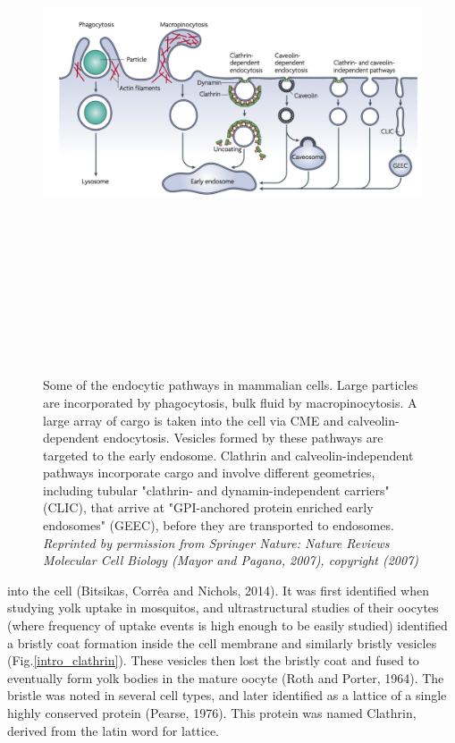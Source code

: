 \begin{figure}[H]
	\hspace*{-1cm}
	\includegraphics[width=14cm, height=16cm, keepaspectratio]{figures/intro/Fig1_mayor}
	\caption[Endocytic pathways in cells]
	{Some of the endocytic pathways in mammalian cells. Large particles are incorporated by phagocytosis, bulk fluid by macropinocytosis. A large array of cargo is taken into the cell via CME and calveolin-dependent endocytosis. Vesicles formed by these pathways are targeted to the early endosome. Clathrin and calveolin-independent pathways incorporate cargo and involve different geometries, including tubular "clathrin- and dynamin-independent carriers" (CLIC), that arrive at "GPI-anchored protein enriched early endosomes" (GEEC), before they are transported to endosomes.  \textit{Reprinted by permission from Springer Nature: Nature Reviews Molecular Cell Biology (Mayor and Pagano, 2007), copyright (2007)}
		\label{intro_mayor}}
\end{figure}

 into the cell (Bitsikas, Corrêa and Nichols, 2014). It was first identified when studying yolk uptake in mosquitos, and ultrastructural studies of their oocytes (where frequency of uptake events is high enough to be easily studied) identified a bristly coat formation inside the cell membrane and similarly bristly vesicles (Fig.\ref{intro_clathrin}). These vesicles then lost the bristly coat and fused to eventually form yolk bodies in the mature oocyte (Roth and Porter, 1964). The bristle was noted in several cell types, and later identified as a lattice of a single highly conserved protein (Pearse, 1976). This protein was named Clathrin, derived from the latin word for lattice. 


